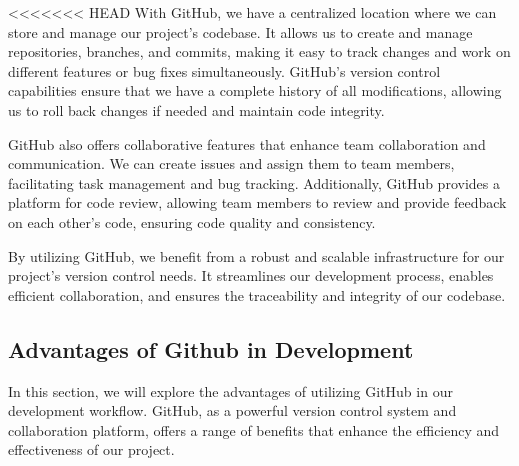 <<<<<<< HEAD
With GitHub, we have a centralized location where we can store and manage our project's codebase. It allows us to create and manage repositories, branches, and commits, making it easy to track changes and work on different features or bug fixes simultaneously. GitHub's version control capabilities ensure that we have a complete history of all modifications, allowing us to roll back changes if needed and maintain code integrity.

GitHub also offers collaborative features that enhance team collaboration and communication. We can create issues and assign them to team members, facilitating task management and bug tracking. Additionally, GitHub provides a platform for code review, allowing team members to review and provide feedback on each other's code, ensuring code quality and consistency.

By utilizing GitHub, we benefit from a robust and scalable infrastructure for our project's version control needs. It streamlines our development process, enables efficient collaboration, and ensures the traceability and integrity of our codebase.
\subsection{Advantages of Github in Development}
In this section, we will explore the advantages of utilizing GitHub in our development workflow. GitHub, as a powerful version control system and collaboration platform, offers a range of benefits that enhance the efficiency and effectiveness of our project.

